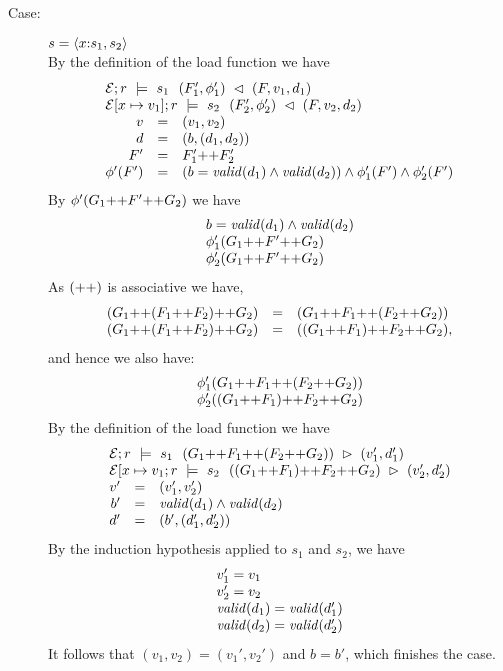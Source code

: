 {\begin{description}
\item[Case:] $s = \langle x {:} s_1, s_2 \rangle$\\[1ex]
%
By the definition of the load function we have
\[
\begin{array}{rcll}
\multicolumn{3}{l}{\store{\Env}{F}{r}{v_1,d_1}{s_1}{F_1',\phi_1'}}\\
\multicolumn{3}{l}{\store{\Env[x \mapsto v_1]}{F}{r}{v_2,d_2}{s_2}{F_2',\phi_2'}}\\
v &=& (v_1,v_2)\\
d &=& (b,(d_1,d_2))\\
F' &=& F_1' \FAppend F_2'\\
\phi'(F') &=& (b = \valid{d_1} \wedge \valid{d_2}) \wedge \phi_1'(F') \wedge \phi_2'(F')
\end{array}
\]
By $\phi'(G_1 \text{++} F' \text{++} G_2)$ we have
\[
\begin{array}{l}
b = \mathit{valid}(d_1) \wedge \mathit{valid}(d_2)\\
\phi_1'(G_1 \text{++} F' \text{++} G_2)\\
\phi_2'(G_1 \text{++} F' \text{++} G_2)\\
\end{array}
\]
%
As $(\text{++})$ is associative we have,
\[
\begin{array}{rcl}
(G_1\text{++} (F_1\text{++} F_2)\text{++} G_2) &=& (G_1\text{++} F_1\text{++} (F_2\text{++} G_2))\\
(G_1\text{++} (F_1\text{++} F_2)\text{++} G_2) &=& ((G_1\text{++} F_1)\text{++} F_2\text{++} G_2),\\
\end{array}
\]
and hence we also have:
\[
\begin{array}{l}
\phi_1'(G_1\text{++} F_1\text{++} (F_2\text{++} G_2))\\
\phi_2'((G_1\text{++} F_1)\text{++} F_2\text{++} G_2)\\
\end{array}
\]
By the definition of the load function we have 
\[ 
\begin{array}{rcll}
\multicolumn{3}{l}{\load{\Env}{(G_1 \FAppend F_1 \FAppend (F_2 \FAppend G_2))}{r}{s_1}{v_1',d_1'}}\\
\multicolumn{3}{l}{\load{\Env[x \mapsto v_1}{((G_1 \FAppend F_1) \FAppend F_2 \FAppend G_2)}{r}{s_2}{v_2',d_2'}}\\
v' &=& (v_1',v_2')\\
b' &= & \valid{d_1} \wedge \valid{d_2}\\
d' &=& (b',(d_1',d_2'))\\
\end{array}
\]
%
By the induction hypothesis applied to $s_1$ and $s_2$, we have 
\[
\begin{array}{l}
v_1' = v_1\\
v_2' = v_2\\
\mathit{valid}(d_1) = \mathit{valid}(d_1')\\
\mathit{valid}(d_2) = \mathit{valid}(d_2')\\
\end{array}
\]
It follows that $(v_1,v_2) = (v_1',v_2')$ and $b = b'$, which
finishes the case.


\end{description}}
